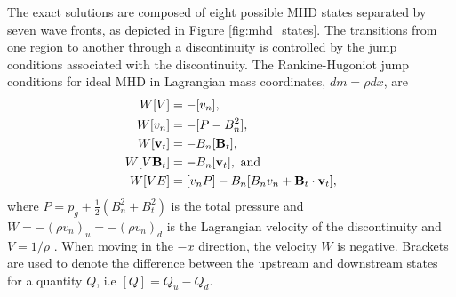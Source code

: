 The exact solutions are composed of eight possible MHD states separated by seven wave fronts, as depicted in Figure \ref{fig:mhd_states}.  The transitions from one region to another through a discontinuity is controlled by the jump conditions associated with the discontinuity.  The Rankine-Hugoniot jump conditions for ideal MHD in Lagrangian mass coordinates, $dm = \rho dx$, are 
\begin{align} 
\label{eqn:jump1} W[V] &= -[v_n], \\ 
\label{eqn:jump2} W[v_n] &= -[P - B_n^2], \\
\label{eqn:jump3} W[\mathbf{v}_{t}] &= -B_n[\mathbf{B}_{t}], \\
\label{eqn:jump5} W[V\mathbf{B}_{t}] &= -B_n[\mathbf{v}_{t}], \text{ and}\\
\label{eqn:jump7} W[VE] &= [v_nP] - B_n[B_nv_n + \mathbf{B}_{t}\cdot\mathbf{v}_{t}],
\end{align}
where $P = p_g + \frac{1}{2}(B_n^2 + B_{t}^2)$ is the total pressure and $W = -(\rho v_n)_u = -(\rho v_n)_d$ is the Lagrangian velocity of the discontinuity and $V = 1/\rho$ \citep{Dai:1994a,Ryu:1995a}.  When moving in the $-x$ direction, the velocity $W$ is negative. Brackets are used to denote the difference between the upstream and downstream states for a quantity $Q$, i.e $[Q] = Q_u - Q_d$.  

